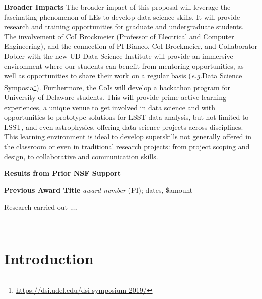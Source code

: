 \documentclass{proposalnsf}
\newcommand{\eg}{\emph{e.g.}}
\begin{document}
\medskip

\noindent
{\bf Broader Impacts}
The broader impact of this proposal will leverage the fascinating phenomenon of LEs to develop data science skills.  It will provide research and training opportunities for graduate and undergraduate students.  The involvement of CoI Brockmeier (Professor of Electrical and Computer Engineering), and the connection of PI Bianco, CoI Brockmeier, and Collaborator Dobler with the new UD Data Science Institute will provide an immersive environment where our students can benefit from mentoring opportunities, as well as opportunities to share their work on a regular basis (\eg  Data Science Symposia\footnote{\url{https://dsi.udel.edu/dsi-symposium-2019/}}).   Furthermore, the CoIs will develop a hackathon program for University of Delaware students.  This will provide prime active learning experiences, a unique venue to get involved in data science and with opportunities to prototype solutions for LSST data analysis, but not limited to LSST, and even astrophysics, offering data science projects across disciplines.  This learning environment is ideal to develop superskills not generally offered in the classroom or even in traditional research projects: from project scoping and design, to collaborative and communication skills.
\renewcommand{\thepage} {B--\arabic{page}}



\renewcommand{\thepage} {D--\arabic{page}}

\newpage

\centerline{\bf Results from Prior NSF Support}

\noindent
{\bf Previous Award Title}
{\it award number} (PI); dates, \$amount

Research carried out ....

\ \\


\section{Introduction}
\end{document}
